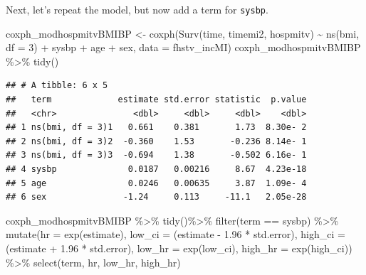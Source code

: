 \documentclass[
]{book}
\newenvironment{Shaded}{\begin{snugshade}}{\end{snugshade}}
\newcommand{\AttributeTok}[1]{\textcolor[rgb]{0.77,0.63,0.00}{#1}}
\newcommand{\DecValTok}[1]{\textcolor[rgb]{0.00,0.00,0.81}{#1}}
\newcommand{\FloatTok}[1]{\textcolor[rgb]{0.00,0.00,0.81}{#1}}
\newcommand{\FunctionTok}[1]{\textcolor[rgb]{0.00,0.00,0.00}{#1}}
\newcommand{\NormalTok}[1]{#1}
\newcommand{\OtherTok}[1]{\textcolor[rgb]{0.56,0.35,0.01}{#1}}
\newcommand{\SpecialCharTok}[1]{\textcolor[rgb]{0.00,0.00,0.00}{#1}}
\newcommand{\StringTok}[1]{\textcolor[rgb]{0.31,0.60,0.02}{#1}}
\begin{document}
Next, let's repeat the model, but now add a term for \texttt{sysbp}.

\begin{Shaded}
\begin{Highlighting}[]
\NormalTok{coxph\_modhospmitvBMIBP }\OtherTok{\textless{}{-}} \FunctionTok{coxph}\NormalTok{(}\FunctionTok{Surv}\NormalTok{(time, timemi2, hospmitv) }\SpecialCharTok{\textasciitilde{}} 
                                  \FunctionTok{ns}\NormalTok{(bmi, }\AttributeTok{df =} \DecValTok{3}\NormalTok{) }\SpecialCharTok{+}\NormalTok{ sysbp }\SpecialCharTok{+}\NormalTok{ age }\SpecialCharTok{+}\NormalTok{ sex,}
                                \AttributeTok{data =}\NormalTok{ fhstv\_incMI)}
\NormalTok{coxph\_modhospmitvBMIBP }\SpecialCharTok{\%\textgreater{}\%}
  \FunctionTok{tidy}\NormalTok{()}
\end{Highlighting}
\end{Shaded}

\begin{verbatim}
## # A tibble: 6 x 5
##   term             estimate std.error statistic  p.value
##   <chr>               <dbl>     <dbl>     <dbl>    <dbl>
## 1 ns(bmi, df = 3)1   0.661    0.381       1.73  8.30e- 2
## 2 ns(bmi, df = 3)2  -0.360    1.53       -0.236 8.14e- 1
## 3 ns(bmi, df = 3)3  -0.694    1.38       -0.502 6.16e- 1
## 4 sysbp              0.0187   0.00216     8.67  4.23e-18
## 5 age                0.0246   0.00635     3.87  1.09e- 4
## 6 sex               -1.24     0.113     -11.1   2.05e-28
\end{verbatim}

\begin{Shaded}
\begin{Highlighting}[]
\NormalTok{coxph\_modhospmitvBMIBP }\SpecialCharTok{\%\textgreater{}\%}
    \FunctionTok{tidy}\NormalTok{()}\SpecialCharTok{\%\textgreater{}\%} 
  \FunctionTok{filter}\NormalTok{(term }\SpecialCharTok{==} \StringTok{\textquotesingle{}sysbp\textquotesingle{}}\NormalTok{) }\SpecialCharTok{\%\textgreater{}\%}
  \FunctionTok{mutate}\NormalTok{(}\AttributeTok{hr =} \FunctionTok{exp}\NormalTok{(estimate),}
         \AttributeTok{low\_ci =}\NormalTok{ (estimate }\SpecialCharTok{{-}} \FloatTok{1.96} \SpecialCharTok{*}\NormalTok{ std.error), }
         \AttributeTok{high\_ci =}\NormalTok{ (estimate }\SpecialCharTok{+} \FloatTok{1.96} \SpecialCharTok{*}\NormalTok{ std.error), }
         \AttributeTok{low\_hr =} \FunctionTok{exp}\NormalTok{(low\_ci), }
         \AttributeTok{high\_hr =} \FunctionTok{exp}\NormalTok{(high\_ci)) }\SpecialCharTok{\%\textgreater{}\%} 
  \FunctionTok{select}\NormalTok{(term, hr, low\_hr, high\_hr)}
\end{Highlighting}
\end{Shaded}
\end{document}

